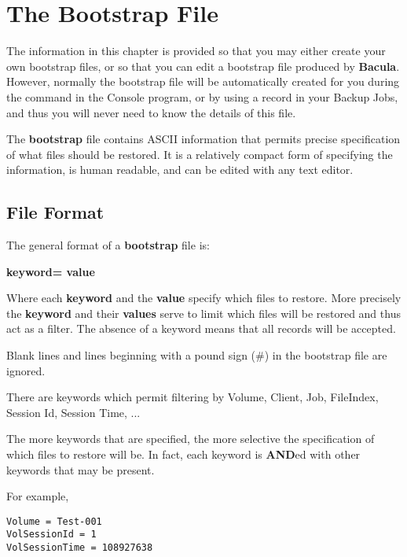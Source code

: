 
\section*{The Bootstrap File}
\label{_ChapterStart43}

The information in this chapter is provided so that you may either create your
own bootstrap files, or so that you can edit a bootstrap file produced by {\bf
Bacula}. However, normally the bootstrap file will be automatically created
for you during the 
 command in the Console program, or
by using a 
 record in your Backup
Jobs, and thus you will never need to know the details of this file. 

The {\bf bootstrap} file contains ASCII information that permits precise
specification of what files should be restored. It is a relatively compact
form of specifying the information, is human readable, and can be edited with
any text editor. 

\subsection*{File Format}

The general format of a {\bf bootstrap} file is: 

{\bf \lt{}keyword\gt{}= \lt{}value\gt{}} 

Where each {\bf keyword} and the {\bf value} specify which files to restore.
More precisely the {\bf keyword} and their {\bf values} serve to limit which
files will be restored and thus act as a filter. The absence of a keyword
means that all records will be accepted. 

Blank lines and lines beginning with a pound sign (\#) in the bootstrap file
are ignored. 

There are keywords which permit filtering by Volume, Client, Job, FileIndex,
Session Id, Session Time, ... 

The more keywords that are specified, the more selective the specification of
which files to restore will be. In fact, each keyword is {\bf AND}ed with
other keywords that may be present. 

For example, 

\footnotesize
\begin{verbatim}
Volume = Test-001
VolSessionId = 1
VolSessionTime = 108927638
\end{verbatim}
\normalsize

